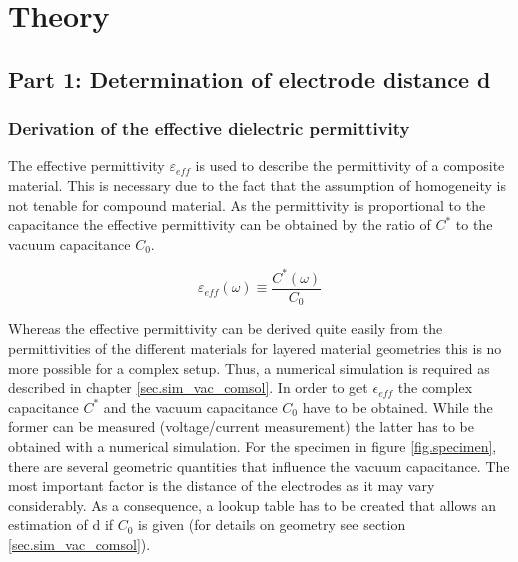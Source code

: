 \chapter{Theory}
\section{Part 1: Determination of electrode distance d}

\subsection{Derivation of the effective dielectric permittivity}
\label{subsec.Derivationeffective}
The effective permittivity $\varepsilon_{eff}$  is used to describe the permittivity of a composite material. This is necessary due to the fact that the assumption of homogeneity is not tenable for compound material. As the permittivity is proportional to the capacitance the effective permittivity can be obtained by the ratio of $C^*$  to the vacuum capacitance $C_0$.

\begin{equation}
\varepsilon_{eff}(\omega) \equiv \frac{C^*(\omega)}{C_0} 
\end{equation}

Whereas the effective permittivity can be derived quite easily from the permittivities of the different materials for layered material geometries this is no more  possible for a complex setup. Thus, a numerical simulation is required as described in chapter \ref{sec.sim_vac_comsol}. In order to get $\epsilon_{eff}$ the complex capacitance $C^*$ and the vacuum capacitance $C_0$ have to be obtained. While the former can be measured (voltage/current measurement) the latter has to be obtained with a numerical simulation. 
For the specimen in figure \ref{fig.specimen}, there are several geometric quantities that influence the vacuum capacitance. The most important factor is the distance of the electrodes as it may vary considerably. As a consequence, a lookup table has to be created that allows an estimation of d if $C_0$ is given (for details on geometry see section \ref{sec.sim_vac_comsol}). 

 


